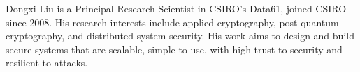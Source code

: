 \documentclass[lettersize,journal]{IEEEtran}
\begin{document}
\begin{IEEEbiography}
{Dongxi Liu} is a Principal Research Scientist in CSIRO’s Data61, joined CSIRO since 2008. His research interests include applied cryptography, post-quantum cryptography, and distributed system security. His work aims to design and build secure systems that are scalable, simple to use, with high trust to security and resilient to attacks.
\end{IEEEbiography}
\end{document}
